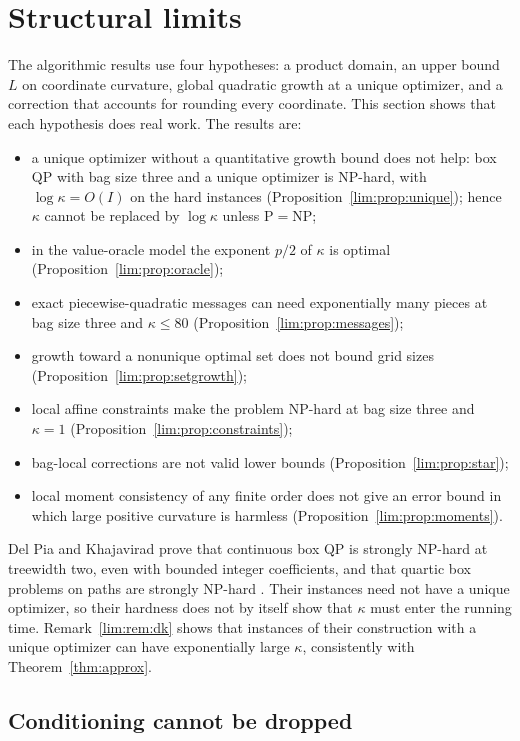 \section{Structural limits}\label{sec:limits}

The algorithmic results use four hypotheses: a product domain, an upper
bound $L$ on coordinate curvature, global quadratic growth at a unique
optimizer, and a correction that accounts for rounding every coordinate.
This section shows that each hypothesis does real work. The results are:
\begin{itemize}
\item a unique optimizer without a quantitative growth bound does not help:
  box QP with bag size three and a unique optimizer is NP-hard, with
  $\log\kappa=O(I)$ on the hard instances
  (Proposition~\ref{lim:prop:unique}); hence $\kappa$ cannot be replaced
  by $\log\kappa$ unless $\mathrm P=\mathrm{NP}$;
\item in the value-oracle model the exponent $p/2$ of $\kappa$ is optimal
  (Proposition~\ref{lim:prop:oracle});
\item exact piecewise-quadratic messages can need exponentially many pieces
  at bag size three and $\kappa\le80$ (Proposition~\ref{lim:prop:messages});
\item growth toward a nonunique optimal set does not bound grid sizes
  (Proposition~\ref{lim:prop:setgrowth});
\item local affine constraints make the problem NP-hard at bag size three
  and $\kappa=1$ (Proposition~\ref{lim:prop:constraints});
\item bag-local corrections are not valid lower bounds
  (Proposition~\ref{lim:prop:star});
\item local moment consistency of any finite order does not give an error
  bound in which large positive curvature is harmless
  (Proposition~\ref{lim:prop:moments}).
\end{itemize}
Del Pia and Khajavirad prove that continuous box QP is strongly NP-hard at
treewidth two, even with bounded integer coefficients, and that quartic
box problems on paths are strongly NP-hard \cite{DelPiaKhajavirad2026}.
Their instances need not have a unique optimizer, so their hardness does
not by itself show that $\kappa$ must enter the running time.
Remark~\ref{lim:rem:dk} shows that instances of their construction with a
unique optimizer can have exponentially large $\kappa$, consistently with
Theorem~\ref{thm:approx}.

\subsection{Conditioning cannot be dropped}\label{sec:limits-conditioning}

